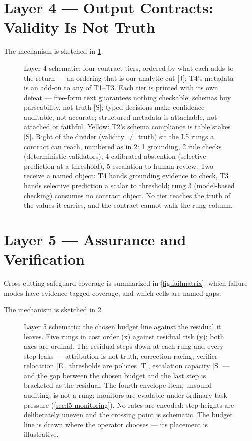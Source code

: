 \documentclass[11pt]{article}
\begin{document}
\section{Layer 4 --- Output Contracts: Validity Is Not Truth}\label{sec:contracts}

\FloatBarrier

\noindent The mechanism is sketched in \cref{fig:layer4-contract}.
\begin{figure}[t]\centering
  \resizebox{\linewidth}{!}{}
  \caption{ Layer 4 schematic: four contract tiers, ordered by what each adds to the return --- an ordering that is our analytic cut [J]; T4's metadata is an add-on to any of T1--T3. Each tier is printed with its own defeat --- free-form text guarantees nothing checkable; schemas buy parseability, not truth [S]; typed decisions make confidence auditable, not accurate; structured metadata is attachable, not attached or faithful. Yellow: T2's schema compliance is table stakes [S]. Right of the divider (validity $\ne$ truth) sit the L5 rungs a contract can reach, numbered as in \cref{fig:layer5-assur}: 1 grounding, 2 rule checks (deterministic validators), 4 calibrated abstention (selective prediction at a threshold), 5 escalation to human review. Two receive a named object: T4 hands grounding evidence to check, T3 hands selective prediction a scalar to threshold; rung 3 (model-based checking) consumes no contract object. No tier reaches the truth of the values it carries, and the contract cannot walk the rung column.}
  \label{fig:layer4-contract}
\end{figure}



\section{Layer 5 --- Assurance and Verification}\label{sec:assurance}
Cross-cutting safeguard coverage is summarized in \cref{fig:failmatrix}: which failure modes have
evidence-tagged coverage, and which cells are named gaps.

\FloatBarrier

\noindent The mechanism is sketched in \cref{fig:layer5-assur}.
\begin{figure}[t]\centering
  \resizebox{\linewidth}{!}{}
  \caption{ Layer 5 schematic: the chosen budget line against the residual it leaves. Five rungs in cost order (x) against residual risk (y); both axes are ordinal. The residual steps down at each rung and every step leaks --- attribution is not truth, correction racing, verifier relocation [E], thresholds are policies [T], escalation capacity [S] --- and the gap between the chosen budget and the last step is bracketed as the residual. The fourth envelope item, unsound auditing, is not a rung: monitors are evadable under ordinary task pressure (\cref{sec:l5-monitoring}). No rates are encoded: step heights are deliberately uneven and the crossing point is schematic. The budget line is drawn where the operator chooses --- its placement is illustrative.}
  \label{fig:layer5-assur}
\end{figure}
\end{document}
